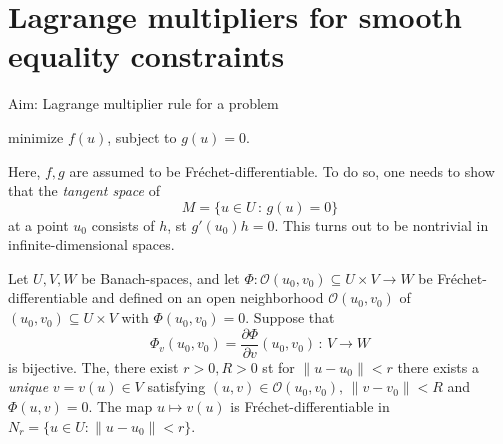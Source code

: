 \documentclass[../skript.tex]{subfiles}
\begin{document}
\section{Lagrange multipliers for smooth equality constraints}\label{section_1.3}
Aim: Lagrange multiplier rule for a problem 
\begin{problemnonumb}
	minimize $f(u)$, subject to $g(u) = 0$.
\end{problemnonumb}
Here, $f,g$ are assumed to be Fréchet-differentiable. To do so, one needs to show that the \emph{tangent space} of
\[
	M=\{u\in U\,:\,g(u)=0\}
\]
at a point $u_0$ consists of $h$, \ac{st} $g'(u_0)h = 0$. This turns out to be nontrivial in infinite-dimensional spaces.
\begin{theorem}\label{theorem_1.26}
	Let $U,V,W$ be Banach-spaces, and let $\Phi:\mathcal{O}(u_0,v_0)\subseteq U\times V\to W$ %
	be Fréchet-differentiable and defined on an open neighborhood $\mathcal{O}(u_0,v_0)$ of $(u_0,v_0)\subseteq U\times V$ with $\Phi(u_0,v_0) = 0$.
	Suppose that 
	\[
		\Phi_v(u_0,v_0)=\frac{\partial\Phi}{\partial v}(u_0,v_0)\,:\,V\to W
	\]
	is bijective. The, there exist $r>0, R>0$ \ac{st} for $\|u-u_0\|<r$ there exists a \emph{unique} $v=v(u)\in V$ satisfying $(u,v)\in\mathcal{O}(u_0,v_0),\,\|v-v_0\|<R$ and $\Phi(u,v) = 0$. The map $u\mapsto v(u)$ is Fréchet-differentiable in $N_r=\{u\in U:\|u-u_0\|<r\}$. 
\end{theorem}
\end{document}
